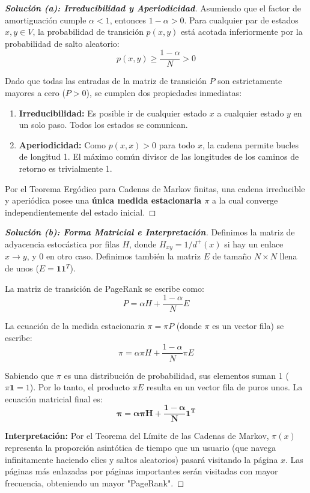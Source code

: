 \documentclass[10pt,a4paper]{article}
\begin{document}
\begin{proof}[\textbf{Solución (a): Irreducibilidad y Aperiodicidad}]
    Asumiendo que el factor de amortiguación cumple $\alpha < 1$, entonces $1 - \alpha > 0$.
    Para cualquier par de estados $x, y \in V$, la probabilidad de transición $p(x,y)$ está acotada inferiormente por la probabilidad de salto aleatorio:
    \[ p(x,y) \ge \frac{1 - \alpha}{N} > 0 \]
    
    Dado que todas las entradas de la matriz de transición $P$ son estrictamente mayores a cero ($P > 0$), se cumplen dos propiedades inmediatas:
    \begin{enumerate}
        \item \textbf{Irreducibilidad:} Es posible ir de cualquier estado $x$ a cualquier estado $y$ en un solo paso. Todos los estados se comunican.
        \item \textbf{Aperiodicidad:} Como $p(x,x) > 0$ para todo $x$, la cadena permite bucles de longitud 1. El máximo común divisor de las longitudes de los caminos de retorno es trivialmente 1.
    \end{enumerate}
    
    Por el Teorema Ergódico para Cadenas de Markov finitas, una cadena irreducible y aperiódica posee una \textbf{única medida estacionaria $\pi$} a la cual converge independientemente del estado inicial.
\end{proof}

\vspace{5mm}

\begin{proof}[\textbf{Solución (b): Forma Matricial e Interpretación}]
    Definimos la matriz de adyacencia estocástica por filas $H$, donde $H_{xy} = 1/d^+(x)$ si hay un enlace $x \to y$, y $0$ en otro caso. Definimos también la matriz $E$ de tamaño $N \times N$ llena de unos ($E = \mathbf{1}\mathbf{1}^T$).
    
    La matriz de transición de PageRank se escribe como:
    \[ P = \alpha H + \frac{1 - \alpha}{N} E \]
    
    La ecuación de la medida estacionaria $\pi = \pi P$ (donde $\pi$ es un vector fila) se escribe:
    \[ \pi = \alpha \pi H + \frac{1 - \alpha}{N} \pi E \]
    
    Sabiendo que $\pi$ es una distribución de probabilidad, sus elementos suman 1 ($\pi \mathbf{1} = 1$). Por lo tanto, el producto $\pi E$ resulta en un vector fila de puros unos. La ecuación matricial final es:
    \[ \mathbf{\pi = \alpha \pi H + \frac{1 - \alpha}{N} \mathbf{1}^T} \]
    
    \textbf{Interpretación:} Por el Teorema del Límite de las Cadenas de Markov, $\pi(x)$ representa la proporción asintótica de tiempo que un usuario (que navega infinitamente haciendo clics y saltos aleatorios) pasará visitando la página $x$. Las páginas más enlazadas por páginas importantes serán visitadas con mayor frecuencia, obteniendo un mayor "PageRank".
\end{proof}
\end{document}
